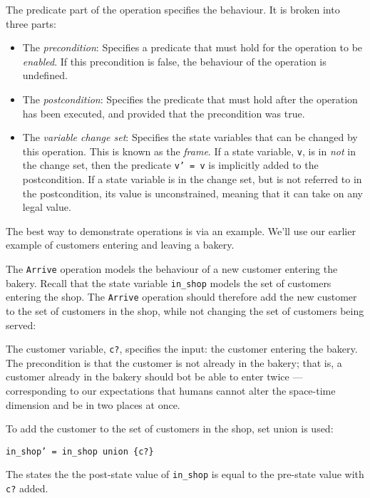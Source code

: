 The predicate part of the operation specifies the behaviour. It is broken into three parts:

\begin{itemize}
 \item The \emph{precondition}: Specifies a predicate that must hold for the operation to be \emph{enabled}. If this precondition is false, the behaviour of the operation is undefined.

 \item The \emph{postcondition}: Specifies the predicate that must hold after the operation has been executed, and provided that the precondition was true.

 \item The \emph{variable change set}: Specifies the state variables that can be changed by this operation. This is known as the \emph{frame}. If a state variable, \texttt{v}, is in \emph{not} in the change set, then the predicate  \texttt{v' = v} is implicitly added to the postcondition. If a state variable is in the change set, but is not referred to in the postcondition, its value is unconstrained, meaning that it can take on any legal value.

\end{itemize}

\begin{example}
The best way to demonstrate operations is via an example. We'll use our earlier example of customers entering and leaving a bakery. 

The \texttt{Arrive} operation models the behaviour of a new customer entering the bakery. Recall that the state variable \texttt{in\_shop} models the set of customers entering the shop. The \texttt{Arrive} operation should therefore add the new customer to the set of customers in the shop, while not changing the set of customers being served:




The customer variable, \texttt{c?}, specifies the input: the customer entering the bakery. The precondition is that the customer is not already in the bakery; that is, a customer already in the bakery should bot be able to enter twice --- corresponding to our expectations that humans cannot alter the space-time dimension and be in two places at once.

To add the customer to the set of customers in the shop, set union is used:

\quad\quad \texttt{in\_shop' = in\_shop union \{c?\}}

The states the the post-state value of \texttt{in\_shop} is equal to the pre-state value with \texttt{c?} added.

\end{example}

